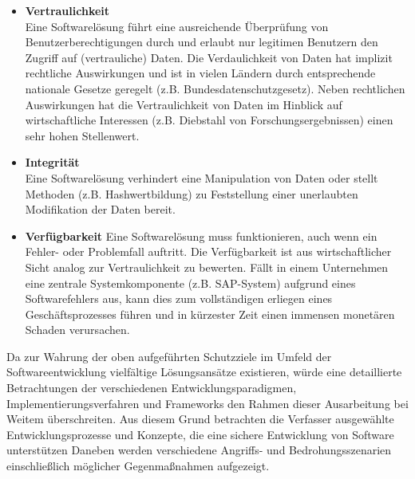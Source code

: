 \begin{itemize}
      \item\textbf{Vertraulichkeit}\\
 	   Eine Softwarelösung führt eine ausreichende Überprüfung von 
 	   Benutzerberechtigungen durch und erlaubt nur legitimen Benutzern 
 	   den Zugriff auf (vertrauliche) Daten. 
 	   Die Verdaulichkeit von Daten hat implizit rechtliche Auswirkungen 
 	   und ist in vielen Ländern durch entsprechende nationale Gesetze 
 	   geregelt (z.B. Bundesdatenschutzgesetz). Neben rechtlichen 
 	   Auswirkungen hat die Vertraulichkeit von Daten im Hinblick auf 
 	   wirtschaftliche Interessen (z.B. Diebstahl von Forschungsergebnissen) 
 	   einen sehr hohen Stellenwert.
	  
	  \item\textbf{Integrität}\\
	   Eine Softwarelösung verhindert eine Manipulation von Daten oder 
	   stellt Methoden (z.B. Hashwertbildung) zu Feststellung einer 
	   unerlaubten Modifikation der Daten bereit.
	  
	  \item\textbf{Verfügbarkeit} 
	   Eine Softwarelösung muss funktionieren, auch wenn ein Fehler- 
	   oder Problemfall auftritt. Die Verfügbarkeit ist aus wirtschaftlicher 
	   Sicht analog zur Vertraulichkeit zu bewerten. Fällt in einem 
	   Unternehmen eine zentrale Systemkomponente (z.B. SAP-System) 
	   aufgrund eines Softwarefehlers aus, kann dies zum vollständigen 
	   erliegen eines Geschäftsprozesses führen und in kürzester Zeit 
	   einen immensen monetären Schaden verursachen.
\end{itemize}

Da zur Wahrung der oben aufgeführten Schutzziele im Umfeld der 
Softwareentwicklung vielfältige Lösungsansätze existieren, würde eine 
detaillierte Betrachtungen der verschiedenen Entwicklungsparadigmen, 
Implementierungsverfahren und Frameworks den Rahmen dieser Ausarbeitung 
bei Weitem überschreiten. Aus diesem Grund betrachten die Verfasser 
ausgewählte Entwicklungsprozesse und Konzepte, die eine sichere 
Entwicklung von Software unterstützen Daneben werden verschiedene 
Angriffs- und Bedrohungsszenarien einschließlich möglicher 
Gegenmaßnahmen aufgezeigt.


